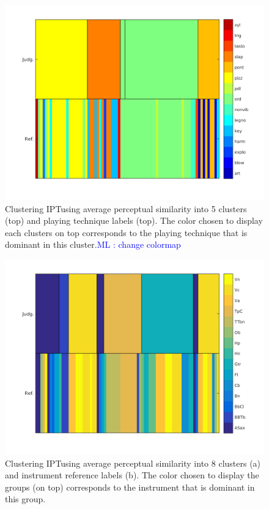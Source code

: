 \documentclass{article}
\newcommand{\ipt}{IPT}
\newcommand{\ml}[1]{\textcolor{blue}{ML : #1}}
\begin{document}
\begin{figure}
\center
\includegraphics[width = \textwidth]{figures/groupModes.png}
\caption{Clustering \ipt using average perceptual similarity into 5 clusters (top) and playing technique labels (top). The color chosen to display each clusters on top corresponds to the playing technique that is dominant in this cluster.\ml{change colormap}}
\label{fig:gm}
\end{figure}

\begin{figure}
\center
\includegraphics[width = \textwidth]{figures/groupInstruments.png}
\caption{Clustering \ipt using average perceptual similarity into 8 clusters (a) and instrument reference labels (b). The color chosen to display the groups (on top) corresponds  to the instrument that is dominant in this group.}
\label{fig:gi}
\end{figure}
\end{document}
